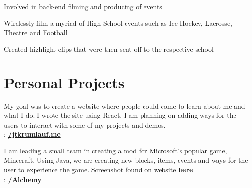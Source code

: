 \documentclass[letterpaper]{deedy-resume} %
\begin{document}
\begin{minipage}[t]{0.66\textwidth}
\begin{tightitemize}
\item Involved in back-end filming and producing of events
\item Wirelessly film a myriad of High School events such as Ice Hockey, Lacrosse, Theatre and Football
\item Created highlight clips that were then sent off to the respective school
\end{tightitemize}

\sectionspace %


\section{Personal Projects}


My goal was to create a website where people could come to learn about me and what I do. I wrote the site using React. I am planning on adding ways for the users to interact with some of my projects and demos. \\
\faGithub:  \href{https://github.com/jtkrumlauf/justinkrumlauf.me}{\bf /jtkrumlauf.me}

\sectionspace %



I am leading a small team in creating a mod for Microsoft's popular game, Minecraft. Using Java, we are creating new blocks, items, events and ways for the user to experience the game. Screenshot found on website \textbf{\href{http://www.justinkrumlauf.me}{here}} \\
\faGithub:  \href{https://github.com/jtkrumlauf/Alchemy}{\bf /Alchemy}

\sectionspace %



\end{minipage}
\end{document}
